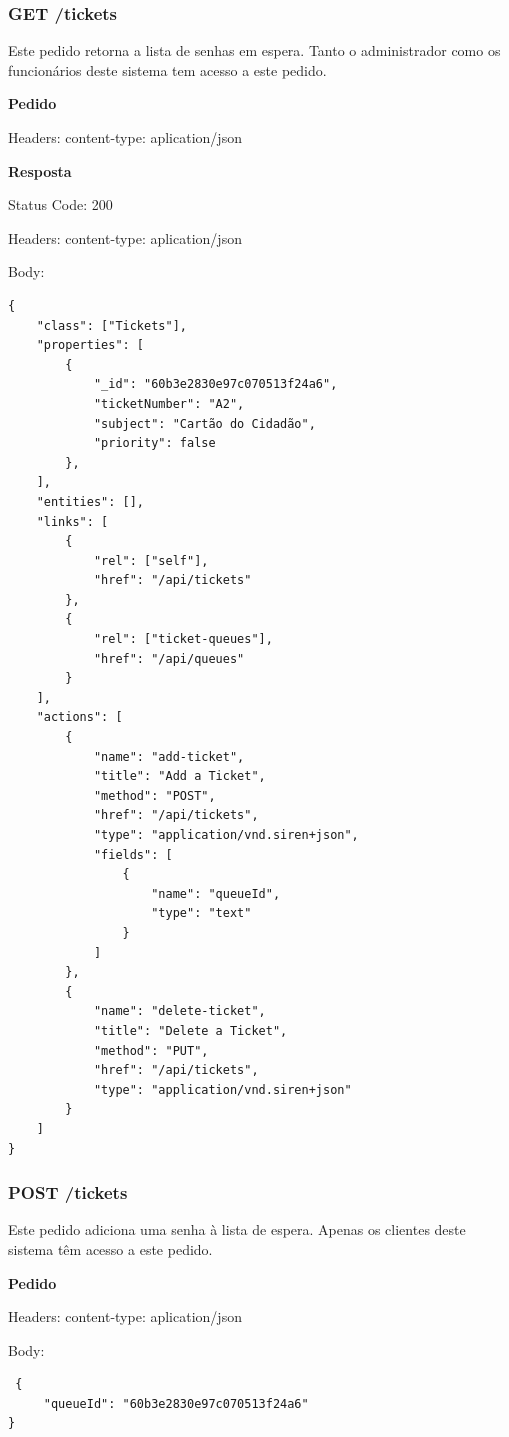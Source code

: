 \documentclass[12pt,a4paper]{article}
\begin{document}
\subsubsection{GET /tickets}
Este pedido retorna a lista de senhas em espera. Tanto o administrador como os funcionários deste sistema tem acesso a este pedido.\par
\vspace{0.5 cm}
 \textbf{Pedido}\par
Headers: content-type: aplication/json\par
\vspace{0.5 cm}
\textbf{Resposta}\par
Status Code: 200\par
Headers: content-type: aplication/json\par
Body: 
\begin{verbatim}
{
    "class": ["Tickets"],
    "properties": [
        {
            "_id": "60b3e2830e97c070513f24a6",
            "ticketNumber": "A2",
            "subject": "Cartão do Cidadão",
            "priority": false         
        },
    ],
    "entities": [],
    "links": [         
        {
            "rel": ["self"],
            "href": "/api/tickets"         
        },        
        {           
            "rel": ["ticket-queues"],
            "href": "/api/queues"         
        }    
    ],
    "actions": [    
        {
            "name": "add-ticket",
            "title": "Add a Ticket",
            "method": "POST",
            "href": "/api/tickets",
            "type": "application/vnd.siren+json",
            "fields": [
                {
                    "name": "queueId",
                    "type": "text"
                }                
            ]
        },             
        {                 
            "name": "delete-ticket",
            "title": "Delete a Ticket",
            "method": "PUT",
            "href": "/api/tickets",
            "type": "application/vnd.siren+json"
        }    
    ]
}
\end{verbatim}
\pagebreak
\subsubsection{POST /tickets}
Este pedido adiciona uma senha à lista de espera. Apenas os clientes deste sistema têm acesso a este pedido.\par
\vspace{0.5 cm}
 \textbf{Pedido}\par
 Headers: content-type: aplication/json\par
Body:
 \begin{verbatim}
 {
     "queueId": "60b3e2830e97c070513f24a6"
}     
 \end{verbatim}
 
\end{document}
